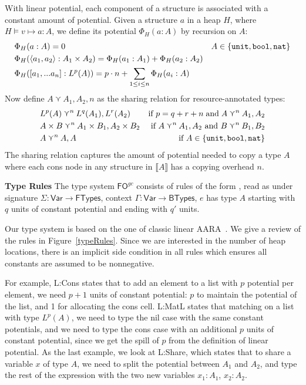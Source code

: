 \documentclass{easychair}
\newcommand{\ms}[1]{\ensuremath{\mathsf{#1}}}
\newcommand{\irl}[1]{\mathtt{#1}}
\newcounter{rule}
\newcommand{\fogc}{\ms{FO}^{gc}}
\theoremstyle{definition}
\begin{document}
With linear potential, each component of a structure is associated with a constant amount of 
potential.  Given a structure $a$ in a heap $H$, where  $H \vDash v \mapsto a : A$, we define 
its potential $\Phi_H(a : A)$ by recursion on $A$: 
%
\begin{align*}
&\Phi_H(a : A) = 0 &A \in \{\unittycst, \booltyabt, \irl{nat}\}\\
&\Phi_H(\pairexcst{a_1}{a_2} : \prodtycst{A_1}{A_2}) = \Phi_H(a_1 : A_1) + \Phi_H(a_2 : A_2)\\
&\Phi_H([a_1,...a_n] : L^p(A)) = p\cdot n + \sum_{1 \le i \le n} \Phi_H(a_i : A)  
\end{align*}
%
Now define $A \curlyvee A_1,A_2,n$ as the sharing relation for resource-annotated types:
\begin{align*}
	&L^p(A) \curlyvee^n L^q(A_1),L^r(A_2) & \text{if } p = q + r + n \;\text{and}\; 
			A \curlyvee^n A_1,A_2\\
	&\prodtycst{A}{B} \curlyvee^n \prodtycst{A_1}{B_1}, \prodtycst{A_2}{B_2}
		&\text{ if } A \curlyvee^n A_1,A_2 \text{ and } B \curlyvee^n B_1,B_2\\
	&A \curlyvee^n  A,A& \text{ if } A \in \{\unittycst, \booltycst, \irl{nat}\}
\end{align*}
The sharing relation captures the amount of potential needed to copy a type $A$ where each 
cons node in any structure in $\llbracket A \rrbracket$ has a copying overhead $n$.

\textbf{Type Rules}
\label{sect:typing}
The type system $\fogc$ consists of rules of the form , 
read as under signature $\Sigma : \ms{Var} \to \ms{FTypes}$, 
context $\Gamma : \ms{Var} \to \ms{BTypes}$, $e$ has type $A$ starting with $q$ units of 
constant potential and ending with $q'$ units.

Our type system is based on the one of classic linear AARA~\cite{Jost03}. 
We give a review of the rules in Figure~\ref{typeRules}.
Since we are interested in the number of heap locations, 
there is an implicit side condition in all rules
which ensures all constants are assumed to be nonnegative.
	
For example, L:Cons states that to add an element to a list with $p$ potential per element, 
we need $p+1$ units of constant potential: $p$ to maintain the potential of the list,
and 1 for allocating the cons cell. L:MatL states that matching on a list with type $L^p(A)$,
we need to type the nil case with the same constant potentials, and we need to type
the cons case with an additional $p$ units of constant potential, since we get 
the spill of $p$ from the definition of linear potential. 
As the last example, we look at L:Share, which states that to share 
a variable $x$ of type $A$, we need to split the potential between $A_1$ and $A_2$, and type the 
rest of the expression with the two new variables $x_1: A_1$, $x_2 : A_2$.
\end{document}
